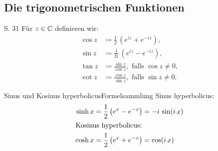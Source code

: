 \subsection{Die trigonometrischen Funktionen}

\begin{definition}{S. 31}
  \label{def:2_2}
  Für $z \in \mathbb{C}$ definieren wir:
  \begin{align}
    \cos z &\coloneqq \frac{1}{2}  \, \left( e^{iz} + e^{-iz} \right),\\
    \sin z &\coloneqq \frac{1}{2i} \, \left( e^{iz} - e^{-iz} \right),\\
    \tan z &\coloneqq \frac{\sin z}{\cos z}, \text{ falls } \cos z \neq 0,\\
    \cot z &\coloneqq \frac{\cos z}{\sin z}, \text{ falls } \sin z \neq 0.
  \end{align}
\end{definition}

\begin{bemerkung}{Sinus und Kosinus hyperbolicus}{Formelsammlung}
  Sinus hyperbolicus:
  \begin{align}
    \sinh x &= \frac{1}{2} \left( e^x - e^{-x} \right) = - i \, \sin(i \, x)\\
    \intertext{Kosinus hyperbolicus:}
    \cosh x &= \frac{1}{2} \left( e^x + e^{-x} \right) = \cos(i \, x)
  \end{align}
\end{bemerkung}

